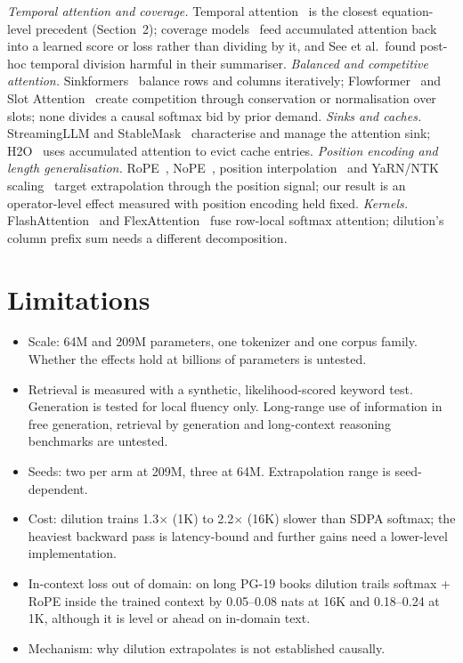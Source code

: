 \documentclass[11pt]{article}
\begin{document}
\emph{Temporal attention and coverage.} Temporal attention~\cite{sankaran,paulus} is the closest
equation-level precedent (Section~2); coverage models~\cite{tu,mi,see} feed accumulated attention back
into a learned score or loss rather than dividing by it, and See et al.\ found post-hoc temporal
division harmful in their summariser. \emph{Balanced and competitive attention.}
Sinkformers~\cite{sinkformers} balance rows and columns iteratively; Flowformer~\cite{flowformer} and
Slot Attention~\cite{slot} create competition through conservation or normalisation over slots; none
divides a causal softmax bid by prior demand. \emph{Sinks and caches.} StreamingLLM and
StableMask~\cite{streamingllm,stablemask} characterise and manage the attention sink; H2O~\cite{h2o}
uses accumulated attention to evict cache entries. \emph{Position encoding and length
generalisation.} RoPE~\cite{rope}, NoPE~\cite{nope}, position interpolation~\cite{pi} and
YaRN/NTK scaling~\cite{yarn} target extrapolation through the position signal; our result is an
operator-level effect measured with position encoding held fixed. \emph{Kernels.}
FlashAttention~\cite{flashattention} and FlexAttention~\cite{flexattention} fuse row-local softmax
attention; dilution's column prefix sum needs a different decomposition.

\section{Limitations}

\begin{itemize}
\item Scale: 64M and 209M parameters, one tokenizer and one corpus family. Whether the effects hold at
billions of parameters is untested.
\item Retrieval is measured with a synthetic, likelihood-scored keyword test. Generation is tested for
local fluency only. Long-range use of information in free generation, retrieval by generation and
long-context reasoning benchmarks are untested.
\item Seeds: two per arm at 209M, three at 64M. Extrapolation range is seed-dependent.
\item Cost: dilution trains 1.3$\times$ (1K) to 2.2$\times$ (16K) slower than SDPA softmax; the heaviest
backward pass is latency-bound and further gains need a lower-level implementation.
\item In-context loss out of domain: on long PG-19 books dilution trails softmax + RoPE inside the
trained context by 0.05--0.08 nats at 16K and 0.18--0.24 at 1K, although it is level or ahead on
in-domain text.
\item Mechanism: why dilution extrapolates is not established causally.
\end{itemize}
\end{document}
